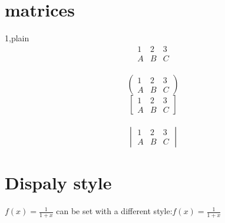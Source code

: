 \documentclass[12pt]{book}
\begin{document}
\section{matrices}
1,plain\\
$$
\begin{matrix}
1 & 2 & 3 \\
A & B & C
\end{matrix}
$$ \\
$$
\begin{pmatrix}
1 & 2 & 3 \\
A & B & C
\end{pmatrix}
$$
$$
\begin{bmatrix}
1 & 2 & 3 \\
A & B & C
\end{bmatrix}
$$\\

$$
\begin{vmatrix}
1 & 2 & 3 \\
A & B & C

\end{vmatrix}
$$
\section{Dispaly style}
$f(x)=\frac{1}{1+x} $ can be set with a different style:$ f(x)=\displaystyle\frac{1}{1+x} $
\end{document}

